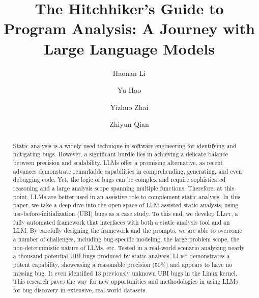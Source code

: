 \documentclass[sigconf, nonacm]{acmart}
\author{Haonan Li}
\affiliation{%
    \institution{UC Riverside}
    \city{Riverside}
    \state{California}
    \country{USA}
}
\author{Yu Hao}
\affiliation{%
    \institution{UC Riverside}
    \city{Riverside}
    \state{California}
    \country{USA}
}
\author{Yizhuo Zhai}
\affiliation{%
    \institution{UC Riverside}
    \city{Riverside}
    \state{California}
    \country{USA}
}
\author{Zhiyun Qian}
\affiliation{%
    \institution{UC Riverside}
    \city{Riverside}
    \state{California}
    \country{USA}
}
\newcommand{\work}{\mbox{\textsc{LLift}}\xspace}
\begin{document}
\title{The Hitchhiker's Guide to Program Analysis: A Journey with Large Language Models}






\begin{abstract}


Static analysis is a widely used technique in software engineering for identifying and mitigating bugs. 
However, a significant hurdle lies in achieving a delicate balance between precision and scalability. 
\acp*{LLM} offer a promising alternative, as recent advances demonstrate remarkable capabilities in comprehending, generating, and even debugging code. Yet, the logic of bugs can be complex and require sophisticated reasoning and a large analysis scope spanning multiple functions. 
Therefore, at this point, LLMs are better used in an assistive role to complement static analysis. 
In this paper, we take a deep dive into the open space of LLM-assisted static analysis, using use-before-initialization (UBI) bugs as a case study. 
To this end, we develop \work, a fully automated framework that interfaces with both a static analysis tool and an LLM. By carefully designing the framework and the prompts, we are able to overcome a number of challenges, including bug-specific modeling, the large problem scope, the non-deterministic nature of LLMs, etc.
Tested in a real-world scenario analyzing nearly a thousand potential UBI bugs produced by static analysis, \work demonstrates a potent capability, showcasing a reasonable precision (50\%) and appears to have no missing bug. It even identified 13 previously unknown UBI bugs in the Linux kernel. 
This research paves the way for new opportunities and methodologies in using LLMs for bug discovery in extensive, real-world datasets. 



\end{abstract}


\maketitle
\end{document}
